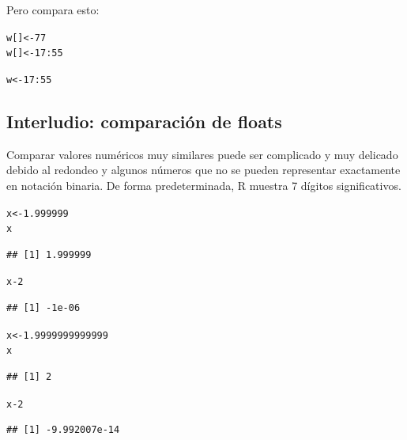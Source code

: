 \documentclass{config/apuntes}\usepackage[]{graphicx}\usepackage[]{xcolor}
\makeatletter
\newcommand{\hlnum}[1]{\textcolor[rgb]{0.686,0.059,0.569}{#1}}%
\newcommand{\hlopt}[1]{\textcolor[rgb]{0,0,0}{#1}}%
\newcommand{\hldef}[1]{\textcolor[rgb]{0.345,0.345,0.345}{#1}}%
\newcommand{\hlkwb}[1]{\textcolor[rgb]{0.69,0.353,0.396}{#1}}%
\newenvironment{kframe}{%
 \def\at@end@of@kframe{}%
 \ifinner\ifhmode%
  \def\at@end@of@kframe{\end{minipage}}%
  \begin{minipage}{\columnwidth}%
 \fi\fi%
 \def\FrameCommand##1{\hskip\@totalleftmargin \hskip-\fboxsep
 \colorbox{shadecolor}{##1}\hskip-\fboxsep
     \hskip-\linewidth \hskip-\@totalleftmargin \hskip\columnwidth}%
 \MakeFramed {\advance\hsize-\width
   \@totalleftmargin\z@ \linewidth\hsize
   \@setminipage}}%
 {\par\unskip\endMakeFramed%
 \at@end@of@kframe}
\newenvironment{knitrout}{}{} %
\makeatother
\begin{document}
Pero compara esto:
\begin{knitrout}
\color{fgcolor}\begin{kframe}
\begin{alltt}
\hldef{w[]} \hlkwb{<-} \hlnum{77}
\hldef{w[]} \hlkwb{<-} \hlnum{17}\hlopt{:}\hlnum{55}
\end{alltt}


{\ttfamily\noindent\color{warningcolor}{\#\# Warning in w[] <- 17:55: número de elementos para sustituir no es un múltiplo de la longitud del reemplazo}}\begin{alltt}
\hldef{w} \hlkwb{<-} \hlnum{17}\hlopt{:}\hlnum{55}
\end{alltt}
\end{kframe}
\end{knitrout}


\subsection{Interludio: comparación de floats}
Comparar valores numéricos muy similares puede ser complicado y muy delicado debido al redondeo y algunos números que no se pueden representar exactamente en notación binaria. De forma predeterminada, R muestra 7 dígitos significativos.

\begin{knitrout}
\color{fgcolor}\begin{kframe}
\begin{alltt}
\hldef{x}  \hlkwb{<-}  \hlnum{1.999999}
\hldef{x}
\end{alltt}
\begin{verbatim}
## [1] 1.999999
\end{verbatim}
\begin{alltt}
\hldef{x} \hlopt{-} \hlnum{2}
\end{alltt}
\begin{verbatim}
## [1] -1e-06
\end{verbatim}
\begin{alltt}
\hldef{x} \hlkwb{<-} \hlnum{1.9999999999999}
\hldef{x}
\end{alltt}
\begin{verbatim}
## [1] 2
\end{verbatim}
\begin{alltt}
\hldef{x}\hlopt{-}\hlnum{2}
\end{alltt}
\begin{verbatim}
## [1] -9.992007e-14
\end{verbatim}
\end{kframe}
\end{knitrout}
\end{document}
